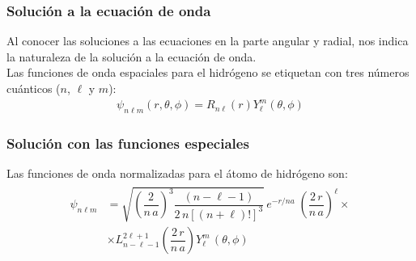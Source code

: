 \documentclass[12pt]{beamer}
\begin{document}
\begin{frame}
\frametitle{Solución a la ecuación de onda}
Al conocer las soluciones a las ecuaciones en la parte angular y radial, nos indica la naturaleza de la solución a la ecuación de onda.
\\
\bigskip
\pause
Las funciones de onda espaciales para el hidrógeno se etiquetan con tres números cuánticos ($n$, $\ell$ y $m$):
\begin{align}
\psi_{n \ell m} (r, \theta, \phi) =  R_{n \ell} (r) Y_{\ell}^{m} (\theta, \phi)
\label{eq:ecuacion_04_74}
\end{align}
\end{frame}
\begin{frame}
\frametitle{Solución con las funciones especiales}
Las funciones de onda normalizadas para el átomo de hidrógeno son:
\begin{align}
\begin{aligned}
\psi_{n \ell m} &= \sqrt{\left(\dfrac{2}{n \, a} \right)^{3} \dfrac{(n - \ell - 1)}{2 \, n[(n + \ell)!]^{3}}} \, e^{-r/na} \; \left( \dfrac{2 \, r}{n \, a} \right)^{\ell} \times \\[1em]
&\times L_{n - \ell -1}^{2 \ell + 1} \left( \dfrac{2 \, r}{n \, a} \right) Y_{\ell}^{m} \, (\theta, \phi)
\end{aligned}
\label{eq:ecuacion_04_89}
\end{align}
\end{frame}
\end{document}
